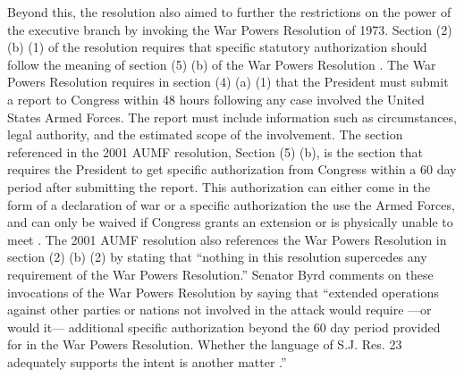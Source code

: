 \documentclass[12pt]{article}
\begin{document}
Beyond this, the resolution also aimed to further the restrictions on the power of the executive branch by invoking the War Powers Resolution of 1973.
Section (2) (b) (1) of the resolution requires that specific statutory authorization should follow the meaning of section (5) (b) of the War Powers Resolution \autocite{daschle2001}.
The War Powers Resolution requires in section (4) (a) (1) that the President must submit a report to Congress within 48 hours following any case involved the United States Armed Forces.
The report must include information such as circumstances, legal authority, and the estimated scope of the involvement.
The section referenced in the 2001 AUMF resolution, Section (5) (b), is the section that requires the President to get specific authorization from Congress within a 60 day period after submitting the report.
This authorization can either come in the form of a declaration of war or a specific authorization the use the Armed Forces, and can only be waived if Congress grants an extension or is physically unable to meet \autocite{zablocki1973}.
The 2001 AUMF resolution also references the War Powers Resolution in section (2) (b) (2) by stating that ``nothing in this resolution supercedes any requirement of the War Powers Resolution.''
Senator Byrd comments on these invocations of the War Powers Resolution by saying that ``extended operations against other parties or nations not involved in the attack would require —or would it— additional specific authorization beyond the 60 day period provided for in the War Powers Resolution. Whether the language of S.J. Res. 23 adequately supports the intent is another matter \autocite[SS950]{byrd2001a}.''

\newpage
{}
\printbibliography[heading=none]{}
\end{document}
